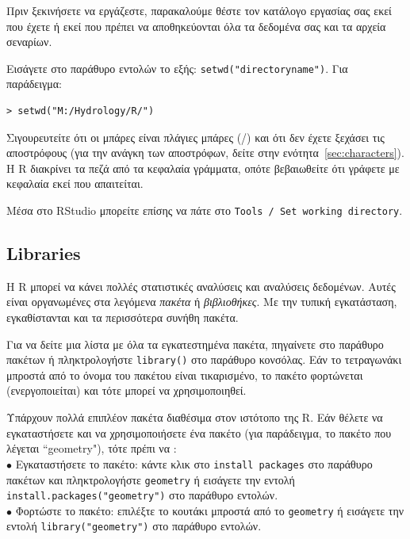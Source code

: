 \documentclass[a4paper,11pt,twocolumn,tablecaptionabove]{scrartcl}
\begin{document}
Πριν ξεκινήσετε να εργάζεστε, παρακαλούμε θέστε τον κατάλογο εργασίας σας εκεί που έχετε ή εκεί που πρέπει
να αποθηκεύονται όλα τα δεδομένα σας και τα αρχεία σεναρίων.

Εισάγετε στο παράθυρο εντολών το εξής: \verb!setwd("directoryname")!. Για παράδειγμα:
\begin{Verbatim}[frame=single,gobble=0]
> setwd("M:/Hydrology/R/")
\end{Verbatim}
Σιγουρευτείτε ότι οι μπάρες είναι πλάγιες μπάρες (/) και ότι δεν έχετε ξεχάσει τις αποστρόφους (για την ανάγκη
των αποστρόφων, δείτε στην ενότητα~\ref{sec:characters}). Η R διακρίνει τα πεζά από τα κεφαλαία γράμματα, οπότε
βεβαιωθείτε ότι γράφετε με κεφαλαία εκεί που απαιτείται.

Μέσα στο RStudio μπορείτε επίσης να πάτε στο \texttt{Tools / Set working directory}.

\subsection{Libraries} 

Η R μπορεί να κάνει πολλές στατιστικές αναλύσεις και αναλύσεις δεδομένων. Αυτές είναι οργανωμένες στα 
λεγόμενα \emph{πακέτα} ή \emph{βιβλιοθήκες}. Με την τυπική εγκατάσταση, εγκαθίστανται και τα περισσότερα
συνήθη πακέτα. 

Για να δείτε μια λίστα με όλα τα εγκατεστημένα πακέτα, πηγαίνετε στο παράθυρο πακέτων ή πληκτρολογήστε 
\verb!library()! στο παράθυρο κονσόλας. Εάν το τετραγωνάκι μπροστά από το όνομα του πακέτου είναι τικαρισμένο,
το πακέτο φορτώνεται (ενεργοποιείται) και τότε μπορεί να χρησιμοποιηθεί. 

Υπάρχουν πολλά επιπλέον πακέτα διαθέσιμα στον ιστότοπο της R. Εάν θέλετε να εγκαταστήσετε και να χρησιμοποιήσετε
ένα πακέτο (για παράδειγμα, το πακέτο που λέγεται ``geometry"), τότε πρέπι να :\\
\noindent $\bullet$ Εγκαταστήσετε το πακέτο:  κάντε κλικ στο \texttt{install packages} στο παράθυρο πακέτων
και πληκτρολογήστε \texttt{geometry} ή εισάγετε την εντολή \verb!install.packages("geometry")! στο παράθυρο
εντολών.\\
\noindent $\bullet$ Φορτώστε το πακέτο: επιλέξτε το κουτάκι μπροστά από το \texttt{geometry} ή εισάγετε
την εντολή \verb!library("geometry")! στο παράθυρο εντολών.


\end{document}
